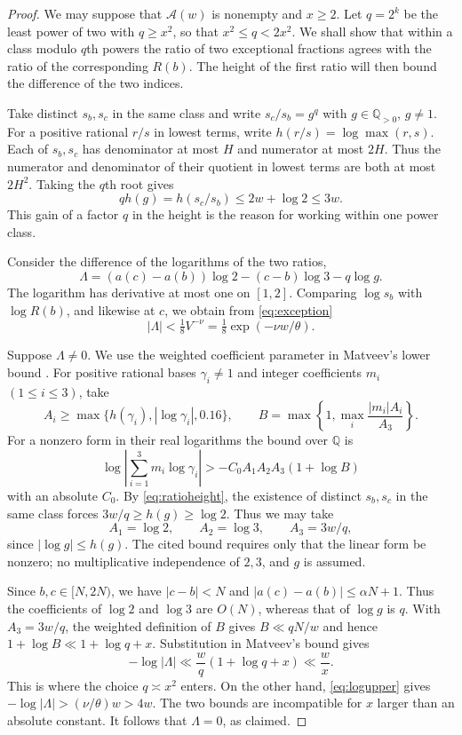\documentclass[11pt,reqno]{amsart}
\theoremstyle{definition}
\newcommand{\Q}{\mathbb Q}
\begin{document}
\begin{proof}
We may suppose that $\mathcal A(w)$ is nonempty and $x\ge2$.
Let $q=2^k$ be the least power of two with $q\ge x^2$, so that
$x^2\le q<2x^2$. We shall show that within a class modulo $q$th
powers the ratio of two exceptional fractions agrees with the ratio
of the corresponding $R(b)$. The height of the first ratio will
then bound the difference of the two indices.

Take distinct $s_b,s_c$ in the same class and write $s_c/s_b=g^q$
with $g\in\Q_{>0}$, $g\ne1$. For a positive rational $r/s$ in
lowest terms, write $h(r/s)=\log\max(r,s)$. Each of $s_b,s_c$
has denominator at most $H$ and numerator at most $2H$. Thus the
numerator and denominator of their quotient in lowest terms are
both at most $2H^2$. Taking the $q$th root gives
\begin{equation}\label{eq:ratioheight}
 qh(g)=h(s_c/s_b)\le 2w+\log2\le 3w .
\end{equation}
This gain of a factor $q$ in the height is the reason for working
within one power class.

Consider the difference of the logarithms of the two ratios,
\[
 \Lambda=(a(c)-a(b))\log2-(c-b)\log3-q\log g.
\]
The logarithm has derivative at most one on $[1,2]$. Comparing
$\log s_b$ with $\log R(b)$, and likewise at $c$, we obtain
from \eqref{eq:exception}
\begin{equation}\label{eq:logupper}
 |\Lambda|<\tfrac18 V^{-\nu}=\tfrac18\exp(-\nu w/\theta).
\end{equation}

Suppose $\Lambda\ne0$. We use the weighted coefficient parameter
in Matveev's lower bound
\cite[Corollary~2.3, (2.6), with (1.3)]{Matveev}.
For positive rational bases $\gamma_i\ne1$ and integer coefficients
$m_i$ $(1\le i\le3)$, take
\[
 A_i\ge\max\{h(\gamma_i),|\log\gamma_i|,0.16\},
 \qquad B=\max\left\{1,\max_i\frac{|m_i|A_i}{A_3}\right\}.
\]
For a nonzero form in their real logarithms the bound over $\Q$ is
\[
 \log\left|\sum_{i=1}^3m_i\log\gamma_i\right|
 >-C_0 A_1A_2A_3(1+\log B)
\]
with an absolute $C_0$. By \eqref{eq:ratioheight},
the existence of distinct
$s_b,s_c$ in the same class forces
$3w/q\ge h(g)\ge\log2$. Thus we may take
\[
 A_1=\log2,\qquad A_2=\log3,\qquad A_3=3w/q,
\]
since $|\log g|\le h(g)$. The cited bound requires
only that the linear form be nonzero; no multiplicative
independence of $2,3$, and $g$ is assumed.

Since $b,c\in[N,2N)$, we have
$|c-b|<N$ and $|a(c)-a(b)|\le\alpha N+1$.
Thus the coefficients of $\log2$ and $\log3$
are $O(N)$, whereas that of $\log g$ is $q$.
With $A_3=3w/q$, the weighted definition of $B$
gives $B\ll qN/w$ and hence
$1+\log B\ll1+\log q+x$. Substitution in Matveev's bound gives
\[
 -\log|\Lambda|\ll\frac{w}{q}(1+\log q+x)\ll\frac wx .
\]
This is where the choice $q\asymp x^2$ enters. On the other hand,
\eqref{eq:logupper} gives $-\log|\Lambda|>(\nu/\theta)w>4w$.
The two bounds are incompatible for $x$ larger than an absolute
constant. It follows that $\Lambda=0$, as claimed.


\end{proof}
\end{document}
